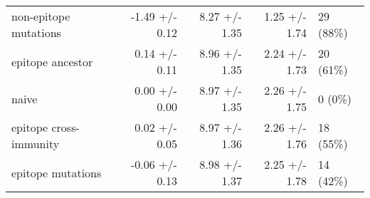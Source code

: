 \begin{tabular*}{1.0\textwidth}{lrrrl}
             non-epitope mutations &  -1.49 +/- 0.12 &                          8.27 +/- 1.35 &                                   1.25 +/- 1.74 &                               29 (88\%) \\
                  epitope ancestor &   0.14 +/- 0.11 &                          8.96 +/- 1.35 &                                   2.24 +/- 1.73 &                               20 (61\%) \\
                             naive &   0.00 +/- 0.00 &                          8.97 +/- 1.35 &                                   2.26 +/- 1.75 &                                 0 (0\%) \\
            epitope cross-immunity &   0.02 +/- 0.05 &                          8.97 +/- 1.36 &                                   2.26 +/- 1.76 &                               18 (55\%) \\
                 epitope mutations &  -0.06 +/- 0.13 &                          8.98 +/- 1.37 &                                   2.25 +/- 1.78 &                               14 (42\%) \\
\bottomrule
\end{tabular*}
